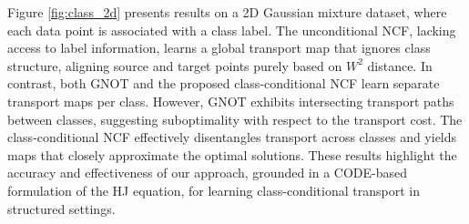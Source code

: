 \documentclass{article} %
\theoremstyle{plain}
\theoremstyle{definition}
\theoremstyle{remark}
\begin{document}
Figure \ref{fig:class_2d} presents results on a 2D Gaussian mixture dataset, where each data point is associated with a class label.
The unconditional NCF, lacking access to label information, learns a global transport map that ignores class structure, aligning source and target points purely based on $W^2$ distance. 
In contrast, both GNOT and the proposed class-conditional NCF learn separate transport maps per class. However, GNOT exhibits intersecting transport paths between classes, suggesting suboptimality with respect to the transport cost.  The class-conditional NCF effectively disentangles transport across classes and yields maps that closely approximate the optimal solutions. These results highlight the accuracy and effectiveness of our approach, grounded in a CODE-based formulation of the HJ equation, for learning class-conditional transport in structured settings.
\end{document}
